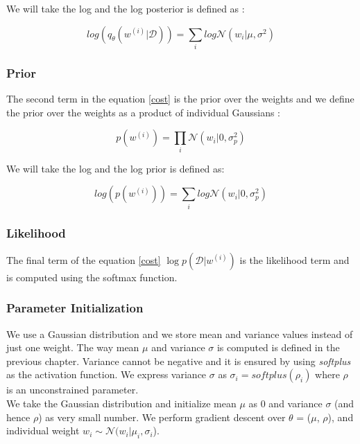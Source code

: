 We will take the log and the log posterior is defined as :

\begin{equation}
    log(q_{\theta}(w^{(i)}|\mathcal{D}))= \sum_{i}log \mathcal{N}(w_{i} | \mu,\sigma^2)
\end{equation}

\subsubsection{Prior}

The second term in the equation \eqref{cost} is the prior over the weights and we define the prior over the weights as a product of individual Gaussians :

\begin{equation}
    p(w^{(i)})= \prod_{i} \mathcal{N}(w_{i} | 0,\sigma_{p}^2)
\end{equation}

We will take the log and the log prior is defined as:

\begin{equation}
    log (p(w^{(i)}))= \sum_{i} log \mathcal{N}(w_{i} | 0,\sigma_{p}^2)
\end{equation}

\subsubsection{ Likelihood }

The final term of the equation \eqref{cost} $\log p(\mathcal{D}|w^{(i)})$ is the likelihood term and is computed using the softmax function.

\subsubsection{Parameter Initialization}

We use a Gaussian distribution and we store mean and variance values instead of just one weight. The way mean $\mu$ and variance $\sigma$ is computed is defined in the previous chapter. Variance cannot be negative and it is ensured by using \textit{softplus} as the activation function. We express variance $\sigma$ as $\sigma_{i}=softplus(\rho_{i})$ where $\rho$ is an unconstrained parameter. \\

We take the Gaussian distribution and initialize mean $\mu$ as 0 and variance $\sigma$ (and hence $\rho$) as very small number. We perform gradient descent over $\theta$ = ($\mu$, $\rho$), and individual weight $w_{i} \sim \mathcal{N} (w_{i} | \mu_{i}, \sigma_{i}$).  

